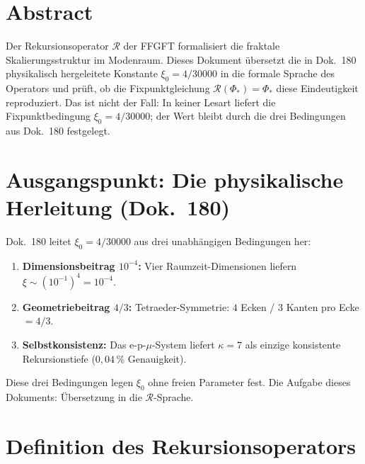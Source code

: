 
\section*{Abstract}

Der Rekursionsoperator $\mathcal{R}$ der FFGFT formalisiert die
fraktale Skalierungsstruktur im Modenraum. Dieses Dokument übersetzt
die in Dok.~180 physikalisch hergeleitete Konstante
$\xi_0 = 4/30000$ in die formale Sprache des Operators und prüft,
ob die Fixpunktgleichung $\mathcal{R}(\Phi_*) = \Phi_*$ diese
Eindeutigkeit reproduziert. Das ist nicht der Fall: In keiner Lesart
liefert die Fixpunktbedingung $\xi_0 = 4/30000$; der Wert bleibt
durch die drei Bedingungen aus Dok.~180 festgelegt.

\section{Ausgangspunkt: Die physikalische Herleitung (Dok.~180)}

Dok.~180 leitet $\xi_0 = 4/30000$ aus drei unabhängigen Bedingungen her:

\begin{enumerate}
  \item \textbf{Dimensionsbeitrag $10^{-4}$:}
    Vier Raumzeit-Dimensionen liefern $\xi \sim (10^{-1})^4 = 10^{-4}$.
  \item \textbf{Geometriebeitrag $4/3$:}
    Tetraeder-Symmetrie: $4$ Ecken / $3$ Kanten pro Ecke $= 4/3$.
  \item \textbf{Selbstkonsistenz:}
    Das e-p-$\mu$-System liefert $\kappa = 7$ als einzige
    konsistente Rekursionstiefe ($0{,}04\,\%$ Genauigkeit).
\end{enumerate}

Diese drei Bedingungen legen $\xi_0$ ohne freien Parameter fest.
Die Aufgabe dieses Dokuments: Übersetzung in die $\mathcal{R}$-Sprache.

\section{Definition des Rekursionsoperators}

